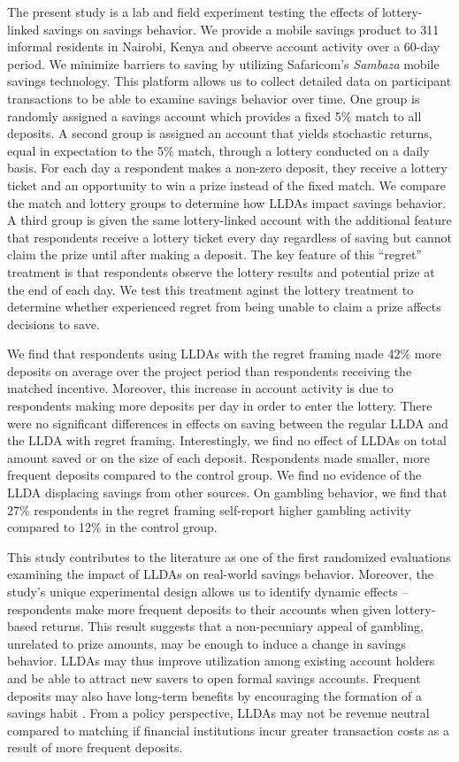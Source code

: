 \documentclass[11pt]{article}
\begin{document}
	The present study is a lab and field experiment testing the effects of lottery-linked savings on savings behavior. We provide a mobile savings product to 311 informal residents in Nairobi, Kenya and observe account activity over a 60-day period. We minimize barriers to saving by utilizing Safaricom's \textit{Sambaza} mobile savings technology. This platform allows us to collect detailed data on participant transactions to be able to examine savings behavior over time. One group is randomly assigned a savings account which provides a fixed 5\% match to all deposits. A second group is assigned an account that yields stochastic returns, equal in expectation to the 5\% match, through a lottery conducted on a daily basis. For each day a respondent makes a non-zero deposit, they receive a lottery ticket and an opportunity to win a prize instead of the fixed match. We compare the match and lottery groups to determine how LLDAs impact savings behavior. A third group is given the same lottery-linked account with the additional feature that respondents receive a lottery ticket every day regardless of saving but cannot claim the prize until after making a deposit. The key feature of this ``regret'' treatment is that respondents observe the lottery results and potential prize at the end of each day. We test this treatment aginst the lottery treatment to determine whether experienced regret from being unable to claim a prize affects decisions to save.

	We find that respondents using LLDAs with the regret framing made 42\% more deposits on average over the project period than respondents receiving the matched incentive. Moreover, this increase in account activity is due to respondents making more deposits per day in order to enter the lottery. There were no significant differences in effects on saving between the regular LLDA and the LLDA with regret framing. Interestingly, we find no effect of LLDAs on total amount saved or on the size of each deposit. Respondents made smaller, more frequent deposits compared to the control group. We find no evidence of the LLDA displacing savings from other sources. On gambling behavior, we find that 27\% respondents in the regret framing self-report higher gambling activity compared to 12\% in the control group.

	This study contributes to the literature as one of the first randomized evaluations examining the impact of LLDAs on real-world savings behavior. Moreover, the study's unique experimental design allows us to identify dynamic effects -- respondents make more frequent deposits to their accounts when given lottery-based returns. This result suggests that a non-pecuniary appeal of gambling, unrelated to prize amounts, may be enough to induce a change in savings behavior. LLDAs may thus improve utilization among existing account holders and be able to attract new savers to open formal savings accounts. Frequent deposits may also have long-term benefits by encouraging the formation of a savings habit . From a policy perspective, LLDAs may not be revenue neutral compared to matching if financial institutions incur greater transaction costs as a result of more frequent deposits.
\end{document}
